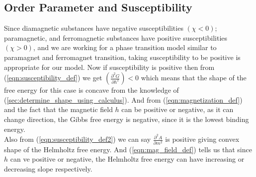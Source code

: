	\subsection{Order Parameter and Susceptibility}
	Since diamagnetic substances have negative susceptibilities $(\chi < 0)$; paramagnetic, and ferromagnetic substances have positive susceptibilities $(\chi > 0)$, and we are working for a phase transition model similar to paramagnet and ferromagnet transition, taking susceptibility to be positive is appropriate for our model. Now if susceptibility is positive then from (\ref{eqn:susceptibility_def}) we get $\left(\frac{\partial^2G}{\partial h ^2}\right) < 0$ which means that the shape of the free energy for this case is concave from the knowledge of (\ref{sec:determine_shape_using_calculus}). And from (\ref{eqn:magnetization_def}) and the fact that the magnetic field $h$ can be positive or negative, as it can change direction, the Gibbs free energy is negative, since it is the lowest binding energy. \\
	Also from (\ref{eqn:susceptibility_def2}) we can say $\frac{\partial^2 A}{\partial m ^2}$ is positive giving convex shape of the Helmholtz free energy. And (\ref{eqn:mag_field_def}) tells us that since $h$ can ve positive or negative, the Helmholtz free energy can have increasing or decreasing slope respectively.
	


